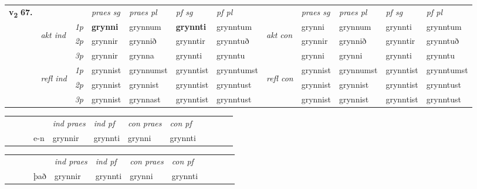 \begin{tabular}{llllllllllll} \toprule
\multirow{4}{*}{{{\textbf{v{\textsubscript{2}}} \Large{\textbf{67.}}}}}  & &   &  \textit{praes sg}  & \textit{praes pl}  &\textit{ pf sg} & \textit{pf pl} &  &  \textit{praes sg}  & \textit{praes pl}  & \textit{pf sg} & \textit{pf pl } \\*
	\cmidrule{4-7} \cmidrule{9-12}
 & \multirow{3}{*}{\begin{turn}{90}\textit{akt ind}\end{turn}} & {\textit{1p}} & \textbf{grynni} & grynnum    & \textbf{grynnti} & grynntum & \multirow{3}{*}{\begin{turn}{90}\textit{akt con}\end{turn}} &grynni & grynnum & grynnti & grynntum\\*
& &  {\textit{2p}} &  grynnir  & grynnið   & grynntir & grynntuð & & grynnir & grynnið & grynntir & grynntuð \\*
& &  {\textit{3p}} & grynnir & grynna   & grynnti & grynntu & & grynni & grynni& grynnti & grynntu  \\*
\cmidrule{4-7} \cmidrule{9-12}
 &\multirow{3}{*}{\begin{turn}{90}\textit{refl ind}\end{turn}} & {\textit{1p}} & grynnist & grynnumst    & grynntist & grynntumst & \multirow{3}{*}{\begin{turn}{90}\textit{refl con}\end{turn}}  &grynnist & grynnumst & grynntist & grynntumst\\*
 &&  {\textit{2p}} &  grynnist  & grynnist   & grynntist & grynntust & &grynnist & grynnist & grynntist & grynntust \\*
& &  {\textit{3p}} & grynnist & grynnast   & grynntist & grynntust & & grynnist & grynnist& grynntist & grynntust  \\*
\cmidrule{4-7} \cmidrule{9-12}
\end{tabular}


\begin{tabular}{llllllllllll}
 & &  & &  \textit{ind praes} & \textit{ind pf} & \textit{con praes} & \textit{con pf} \\*
&  & & e-n & grynnir & grynnti & grynni & grynnti \\*
\cmidrule{5-9}
\end{tabular}


\begin{tabular}{llllllllllll}
 & &  & &  \textit{ind praes} & \textit{ind pf} & \textit{con praes} & \textit{con pf} \\*
&  & & það & grynnir & grynnti & grynni & grynnti \\*
\cmidrule{5-9}
\end{tabular}


